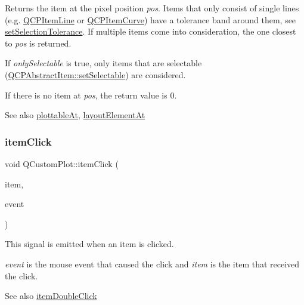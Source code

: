 Returns the item at the pixel position {\itshape pos}. Items that only consist of single lines (e.\+g. \hyperlink{class_q_c_p_item_line}{Q\+C\+P\+Item\+Line} or \hyperlink{class_q_c_p_item_curve}{Q\+C\+P\+Item\+Curve}) have a tolerance band around them, see \hyperlink{class_q_custom_plot_a4dc31241d7b09680950e19e5f971ed93}{set\+Selection\+Tolerance}. If multiple items come into consideration, the one closest to {\itshape pos} is returned.

If {\itshape only\+Selectable} is true, only items that are selectable (\hyperlink{class_q_c_p_abstract_item_a8a8e32a55bc478b849756a78c2d87fd2}{Q\+C\+P\+Abstract\+Item\+::set\+Selectable}) are considered.

If there is no item at {\itshape pos}, the return value is 0.

\begin{DoxySeeAlso}{See also}
\hyperlink{class_q_custom_plot_acddbbd8b16dd633f0d94e5a736fbd8cf}{plottable\+At}, \hyperlink{class_q_custom_plot_afaa1d304e0287d140fd238e90889ef3c}{layout\+Element\+At} 
\end{DoxySeeAlso}
\mbox{\label{class_q_custom_plot_ae16b51f52d2b7aebbc7e3e74e6ff2e4b}} 
\subsubsection{\texorpdfstring{item\+Click}{itemClick}}
{\footnotesize\ttfamily void Q\+Custom\+Plot\+::item\+Click (\begin{DoxyParamCaption}\item[{\hyperlink{class_q_c_p_abstract_item}{Q\+C\+P\+Abstract\+Item} $\ast$}]{item,  }\item[{Q\+Mouse\+Event $\ast$}]{event }\end{DoxyParamCaption})\hspace{0.3cm}{\ttfamily [signal]}}

This signal is emitted when an item is clicked.

{\itshape event} is the mouse event that caused the click and {\itshape item} is the item that received the click.

\begin{DoxySeeAlso}{See also}
\hyperlink{class_q_custom_plot_ac83aa9f5a3e9bb3efc9cdc763dcd42a6}{item\+Double\+Click} 
\end{DoxySeeAlso}
\mbox{\label{class_q_custom_plot_a16025daf0341f9362be3080e404424c2}} 
